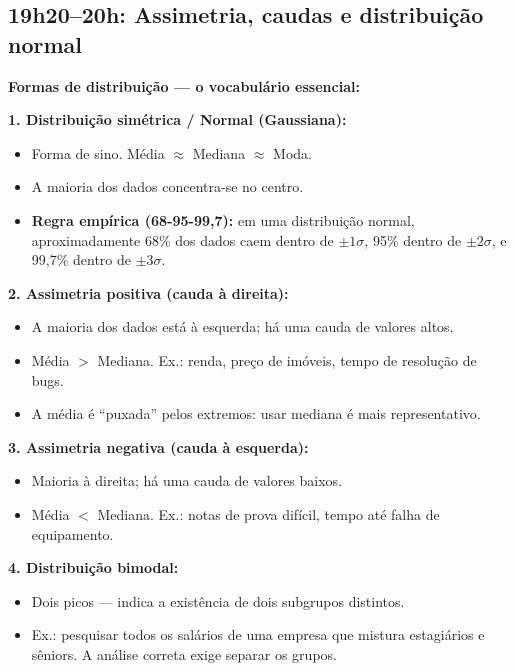 \subsection{19h20–20h: Assimetria, caudas e distribuição normal}

\begin{SolvedBox}
\textbf{Formas de distribuição — o vocabulário essencial:}

\textbf{1. Distribuição simétrica / Normal (Gaussiana):}
\begin{itemize}
  \item Forma de sino. Média $\approx$ Mediana $\approx$ Moda.
  \item A maioria dos dados concentra-se no centro.
  \item \textbf{Regra empírica (68-95-99,7):} em uma distribuição normal,
  aproximadamente 68\% dos dados caem dentro de $\pm 1\sigma$, 95\% dentro
  de $\pm 2\sigma$, e 99,7\% dentro de $\pm 3\sigma$.
\end{itemize}

\textbf{2. Assimetria positiva (cauda à direita):}
\begin{itemize}
  \item A maioria dos dados está à esquerda; há uma cauda de valores altos.
  \item Média $>$ Mediana. Ex.: renda, preço de imóveis, tempo de resolução de bugs.
  \item A média é ``puxada'' pelos extremos: usar mediana é mais representativo.
\end{itemize}

\textbf{3. Assimetria negativa (cauda à esquerda):}
\begin{itemize}
  \item Maioria à direita; há uma cauda de valores baixos.
  \item Média $<$ Mediana. Ex.: notas de prova difícil, tempo até falha de equipamento.
\end{itemize}

\textbf{4. Distribuição bimodal:}
\begin{itemize}
  \item Dois picos — indica a existência de dois subgrupos distintos.
  \item Ex.: pesquisar todos os salários de uma empresa que mistura estagiários
  e sêniors. A análise correta exige separar os grupos.
\end{itemize}
\end{SolvedBox}


